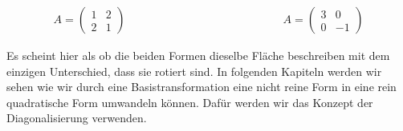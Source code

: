 \begin{figure}[h]
    \centering
    \begin{minipage}{0.4\textwidth}
        \centering
    \end{minipage}
    \hfill
    \begin{minipage}{0.4\textwidth}
        \centering
    \end{minipage}
\end{figure}

\begin{equation*}
    \begin{aligned}
        A = \begin{pmatrix} 1 & 2 \\ 2 & 1 \end{pmatrix} \qquad \qquad \qquad \qquad \qquad \qquad \qquad A = \begin{pmatrix} 3 & 0 \\ 0 & -1 \end{pmatrix}
    \end{aligned}
\end{equation*}

\vspace{0.5\baselineskip}

Es scheint hier als ob die beiden Formen dieselbe Fläche beschreiben mit dem einzigen Unterschied, dass sie rotiert sind. In folgenden Kapiteln werden wir sehen wie wir durch eine Basistransformation eine nicht reine Form in eine rein quadratische Form umwandeln können. Dafür werden wir das Konzept der Diagonalisierung verwenden.